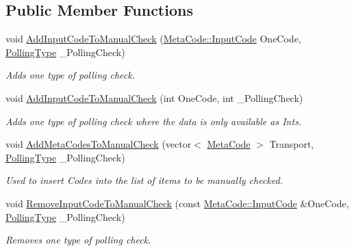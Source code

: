 \subsection*{Public Member Functions}
\begin{DoxyCompactItemize}
\item 
void \hyperlink{structphys_1_1internal_1_1EventManagerInternalData_abf8c7b472e4b19a0c0243dcaf49a38ae}{AddInputCodeToManualCheck} (\hyperlink{classphys_1_1MetaCode_a3e501cbb5bf0f6f1fdb7211465bda8d8}{MetaCode::InputCode} OneCode, \hyperlink{structphys_1_1internal_1_1EventManagerInternalData_ab9ab8380b84448aacf46a63050e159af}{PollingType} \_\-PollingCheck)
\begin{DoxyCompactList}\small\item\em Adds one type of polling check. \item\end{DoxyCompactList}\item 
void \hyperlink{structphys_1_1internal_1_1EventManagerInternalData_a38365985c350611884fdd3eca7d5acd5}{AddInputCodeToManualCheck} (int OneCode, int \_\-PollingCheck)
\begin{DoxyCompactList}\small\item\em Adds one type of polling check where the data is only available as Ints. \item\end{DoxyCompactList}\item 
void \hyperlink{structphys_1_1internal_1_1EventManagerInternalData_ac2e4044e2fc6eb2df18a3e274c175065}{AddMetaCodesToManualCheck} (vector$<$ \hyperlink{classphys_1_1MetaCode}{MetaCode} $>$ Transport, \hyperlink{structphys_1_1internal_1_1EventManagerInternalData_ab9ab8380b84448aacf46a63050e159af}{PollingType} \_\-PollingCheck)
\begin{DoxyCompactList}\small\item\em Used to insert Codes into the list of items to be manually checked. \item\end{DoxyCompactList}\item 
void \hyperlink{structphys_1_1internal_1_1EventManagerInternalData_aadc9e786da13f2c669fc7e054d8fbf37}{RemoveInputCodeToManualCheck} (const \hyperlink{classphys_1_1MetaCode_a3e501cbb5bf0f6f1fdb7211465bda8d8}{MetaCode::InputCode} \&OneCode, \hyperlink{structphys_1_1internal_1_1EventManagerInternalData_ab9ab8380b84448aacf46a63050e159af}{PollingType} \_\-PollingCheck)
\begin{DoxyCompactList}\small\item\em Removes one type of polling check. \item\end{DoxyCompactList}\item 

\end{DoxyCompactItemize}
